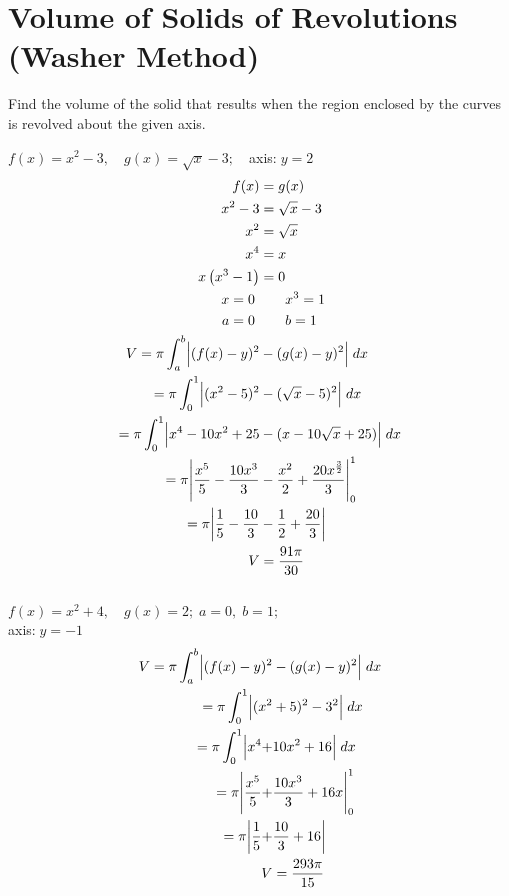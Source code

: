 \documentclass[12pt]{article}
\begin{document}
\section{Volume of Solids of Revolutions (Washer Method)}
Find the volume of the solid that results when the region enclosed by the curves is revolved about the given axis.
\begin{multicols}{2}
\begin{center}
    $f(x)=x^2-3,\quad g(x)=\sqrt{x}-3;\quad$axis:$\;y=2$
    \begin{align*}
        f(x) &= g(x) \\
        x^2-3&=\sqrt{x}-3 \\
        x^2&=\sqrt{x}\\
        x^4&=x\\
        x\left(x^3-1\right)&=0\\
        x=0\ &\qquad\! x^3=1 \\
        a=0\ &\qquad\! b=1 \\
        V=\pi\int^b_a\Bigl|(f(x)-y)^2 &-(g(x)-y)^2\Bigr|\;dx \\
        =\pi\int^1_0\Bigl|(x^2-5)^2 &-(\sqrt{x}-5)^2\Bigr|\;dx \\
        =\pi\int^1_0\Bigl|x^4-10x^2+25 &-(x-10\sqrt{x}+25)\Bigr|\;dx \\
        =\pi\Biggl|\frac{x^5}{5}-\frac{10x^3}{3} &- \frac{x^2}{2}+\frac{20x^{\frac{3}{2}}}{3}\Biggr|^1_0 \\
        =\pi\biggl|\frac{1}{5}-\frac{10}{3}&-\frac{1}{2}+\frac{20}{3}\biggr| \\
        V&=\frac{91\pi}{30} \\
    \end{align*} 
    \vspace{3pt}\\
    $f(x)=x^2+4,\quad g(x)=2;\;a=0,\;b=1;$\\
    \raggedleft axis:$\;y=-1\quad$ 
    \begin{align*}
        V=\pi\int^b_a\Bigl|(f(x)-y)^2 &-(g(x)-y)^2\Bigr|\;dx \\
        =\pi\int^1_0\Bigl|(x^2&+5)^2 -3^2\Bigr|\;dx \\
        =\pi\int^1_0\Bigl|x^4+&10x^2+16\Bigr|\;dx \\
        =\pi\Biggl|\frac{x^5}{5}+&\frac{10x^3}{3} + 16x\Biggr|^1_0 \\
        =\pi\biggl|\frac{1}{5}+&\frac{10}{3}+16\biggr| \\
        V&=\frac{293\pi}{15} \\ 
    \end{align*} 
    

\end{center}
\end{multicols}
\end{document}
